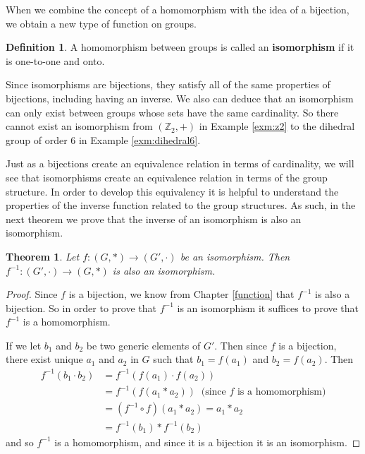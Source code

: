 \documentclass[
]{book}
\newtheorem{theorem}{Theorem}[chapter]
\theoremstyle{definition}
\newtheorem{definition}{Definition}[chapter]
\theoremstyle{definition}
\theoremstyle{definition}
\theoremstyle{definition}
\theoremstyle{remark}
\begin{document}
When we combine the concept of a homomorphism with the idea of a bijection, we obtain a new type of function on groups.

\begin{definition}
A homomorphism between groups is called an \textbf{isomorphism} if it is one-to-one and onto.
\end{definition}

Since isomorphisms are bijections, they satisfy all of the same properties of bijections, including having an inverse. We also can deduce that an isomorphism can only exist between groups whose sets have the same cardinality. So there cannot exist an isomorphism from \((\mathbb{Z}_2,+)\) in Example \ref{exm:z2} to the dihedral group of order 6 in Example \ref{exm:dihedral6}.

Just as a bijections create an equivalence relation in terms of cardinality, we will see that isomorphisms create an equivalence relation in terms of the group structure. In order to develop this equivalency it is helpful to understand the properties of the inverse function related to the group structures. As such, in the next theorem we prove that the inverse of an isomorphism is also an isomorphism.

\begin{theorem}
Let \(f:(G,*)\rightarrow (G',\cdot)\) be an isomorphism. Then \(f^{-1}:(G',\cdot)\rightarrow (G,*)\) is also an isomorphism.
\end{theorem}

\begin{proof}
Since \(f\) is a bijection, we know from Chapter \ref{function} that \(f^{-1}\) is also a bijection. So in order to prove that \(f^{-1}\) is an isomorphism it suffices to prove that \(f^{-1}\) is a homomorphism.

If we let \(b_1\) and \(b_2\) be two generic elements of \(G'\). Then since \(f\) is a bijection, there exist unique \(a_1\) and \(a_2\) in \(G\) such that \(b_1=f(a_1)\) and \(b_2=f(a_2)\). Then
\begin{align*}
  f^{-1}(b_1 \cdot b_2) &= f^{-1}\left( f(a_1)\cdot f(a_2)\right) \\
  &= f^{-1} \left(f(a_1*a_2)\right) \: \mbox{ (since } f \mbox{ is a homomorphism)} \\
  &= (f^{-1}\circ f) (a_1*a_2) = a_1*a_2 \\
  &= f^{-1}(b_1)* f^{-1}(b_2) 
\end{align*}
and so \(f^{-1}\) is a homomorphism, and since it is a bijection it is an isomorphism.
\end{proof}
\end{document}
